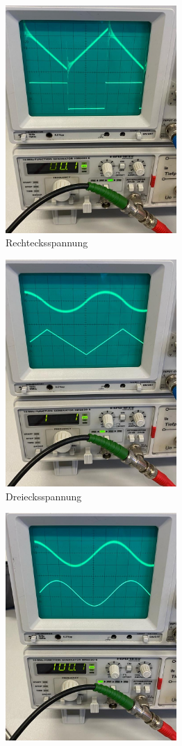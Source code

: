 \begin{figure}[H]
    \begin{subfigure}{0.5\textwidth}
        \centering
        \includegraphics[width=6.5cm]{Rechtecksspannung.jpg}
        \caption{Rechtecksspannung}
        \label{fig:Rechteck}
    \end{subfigure}
    \begin{subfigure}{0.5\textwidth}
        \centering
        \includegraphics[width=6.5cm]{Dreiecksspannung.jpg}
        \caption{Dreiecksspannung}
        \label{fig:Rechteck}
    \end{subfigure}
    \begin{subfigure}{0.5\textwidth}
        \centering
        \includegraphics[width=6.5cm]{Sinusspannung.jpg}

\end{subfigure}
\end{figure}
